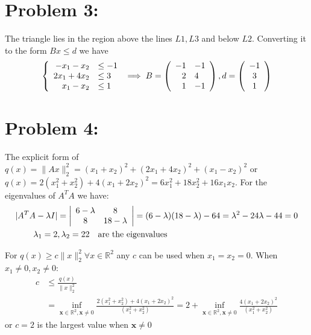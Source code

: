 \documentclass[12pt]{report}
\begin{document}
\section*{Problem 3:}
The triangle lies in the region above the lines $L1,L3$ and below $L2$. Converting it to the form
$Bx\leq d$ we have
\begin{align*}
\left\{\begin{array}{r l}
-x_1-x_2  & \leq -1\\
2x_1+4x_2 & \leq 3\\
x_1-x_2   & \leq 1
\end{array} \right. \implies
B = \left(\begin{array}{r l}
-1  & -1\\
2 & 4 \\
1 & -1
\end{array} \right),
d = \left(\begin{array}{c}
-1\\
3\\
1
\end{array} \right)
\end{align*}

\section*{Problem 4:}
The explicit form of $q(x)=\|Ax\|^2_2=(x_1+x_2)^2+(2x_1+4x_2)^2+(x_1-x_2)^2 $ or \\
$q(x)=2(x_1^2+x_2^2)+4(x_1+2x_2)^2=6x_1^2+18x_2^2+16x_1x_2$. For the eigenvalues of $A^TA$ we have:
\begin{align*}
|A^TA-\lambda I| &= \left|\begin{array}{c c}
6-\lambda & 8\\
8 & 18-\lambda\\
\end{array} \right|
= (6-\lambda )(18-\lambda )-64=\lambda^2-24\lambda-44=0\\
\lambda_1=2&,\lambda_2=22 \quad \text{are the eigenvalues}
\end{align*}

For $ q(x)\geq c\|x\|^2_2 \forall x \in \mathbb{R}^2$ any $c$ can be used when $x_1=x_2=0$. When
$x_1 \neq 0, x_2\neq 0$:
\begin{align*}
c&\leq \frac{q(x)}{\|x\|_2^2}\\
 &= \inf_{\textbf{x}\in \mathbb{R}^2, \textbf{x}\neq 0} \frac{2(x_1^2+x_2^2)+4(x_1+2x_2)^2}{(x_1^2+x_2^2)}
  =2+\inf_{\textbf{x}\in \mathbb{R}^2, \textbf{x}\neq 0}\frac{4(x_1+2x_2)^2}{(x_1^2+x_2^2)}
\end{align*}
or $c=2$ is the largest value when $\textbf{x}\neq 0$
\end{document}
